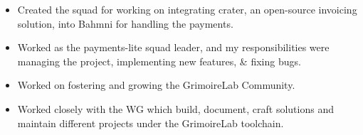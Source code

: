 \documentclass[10pt,a4paper]{style}
\begin{document}
\tagline{}

%

\begin{fullwidth}
\makecvheader
\end{fullwidth}

%




\begin{itemize}
    \item Created the squad for working on integrating crater, an open-source invoicing solution, into Bahmni for handling the payments.
    \item Worked as the payments-lite squad leader, and my responsibilities were managing the project, implementing new features, \& fixing bugs.
\end{itemize}

\divider


\begin{itemize}
    \item Worked on fostering and growing the GrimoireLab Community.
    \item Worked closely with the WG which build, document, craft solutions and maintain different projects under the GrimoireLab toolchain.
\end{itemize}

%

\divider

\end{document}
